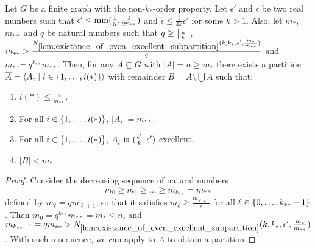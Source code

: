        \begin{lemma} \label{lem:existance_of_excellent_partition_with_equal_size}
            Let $G$ be a finite graph with the non-$k_{*}$-order property.
            Let $\epsilon'$ and $\epsilon$ be two real numbers such that
            $\epsilon' \leq \min ( \frac{1}{5}, \frac{1}{2^{k_{**}}} )$ and $\epsilon \leq \frac{1}{4k} \epsilon'$ for some $k > 1$.
            Also, let $m_*$, $m_{**}$ and $q$ be natural numbers such that $q \geq \left\lceil \frac{1}{\epsilon} \right\rceil$,
            $m_{**} > \frac{N_{\ref{lem:existance_of_even_excellent_subpartition}}
                ( k, k_*, \epsilon', \frac{m_*}{m_{**}} )}{q}$ and $m_* \coloneqq q^{k_{**}} m_{**}$.
            Then, for any $A \subseteq G$ with $|A| = n \geq m_*$ there exists a partition
            $\overline{A} = \left< A_i \mid i \in \{ 1, \dots, i(*) \} \right>$ with remainder $B = A \setminus \bigcup \overline{A}$ such that:
            \begin{enumerate}[label=(\alph*), ref=\alph*]
                \item \label{itm:existance_of_excellent_partition_with_equal_size.a} $i(*) \leq \frac{n}{m_{**}}$.
                \item \label{itm:existance_of_excellent_partition_with_equal_size.b} For all
                    $i \in \{ 1, \dots, i(*) \}$, $|A_i| = m_{**}$.
                \item \label{itm:existance_of_excellent_partition_with_equal_size.c} For all
                    $i \in \{ 1, \dots, i(*) \}$, $A_i$ is $( \frac{\epsilon'}{k}, \epsilon' )$-excellent.
                \item \label{itm:existance_of_excellent_partition_with_equal_size.d} $|B| < m_*$.
            \end{enumerate}
            \begin{proof}
                Consider the decreasing sequence of natural numbers
                \[
                    m_0 \geq m_1 \geq \dots \geq m_{k_{**}} = m_{**}
                \]
                defined by $m_\ell = q m_{\ell+1}$, so that it satisfies $m_\ell \geq \frac{m_{\ell+1}}{\epsilon}$ for all
                $\ell \in \{ 0, \dots, k_{**} - 1 \}$.
                Then $m_0 = q^{k_{**}} m_{**} = m_* \leq n$, and $m_{k_{**}-1} = q m_{**} >
                    N_{\ref{lem:existance_of_even_excellent_subpartition}}( k, k_*, \epsilon', \frac{m_*}{m_{**}} )$.
                With such a sequence, we can apply  to $A$ to obtain a partition

\end{proof}
\end{lemma}
